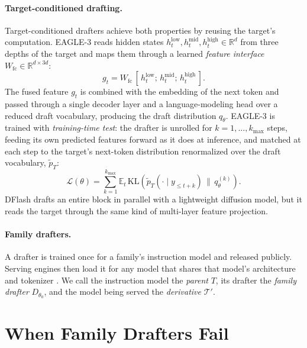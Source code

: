 \documentclass[11pt]{article}
\newcommand{\Tp}{\mathcal{T}'}
\begin{document}
\paragraph{Target-conditioned drafting.}
Target-conditioned drafters achieve both properties by reusing the target's computation.
EAGLE-3 \citep{li2025eagle3} reads hidden states $h^{\text{low}}_t, h^{\text{mid}}_t, h^{\text{high}}_t \in \mathbb{R}^{d}$ from three depths of the target and maps them through a learned \emph{feature interface} $W_{\text{fc}} \in \mathbb{R}^{d \times 3d}$:
\begin{equation}
  g_t = W_{\text{fc}}\,[\,h^{\text{low}}_t ;\, h^{\text{mid}}_t ;\, h^{\text{high}}_t\,].
  \label{eq:interface}
\end{equation}
The fused feature $g_t$ is combined with the embedding of the next token and passed through a single decoder layer and a language-modeling head over a reduced draft vocabulary, producing the draft distribution $q_\theta$.
EAGLE-3 is trained with \emph{training-time test}: the drafter is unrolled for $k=1,\dots,k_{\max}$ steps, feeding its own predicted features forward as it does at inference, and matched at each step to the target's next-token distribution renormalized over the draft vocabulary, $\tilde p_T$:
\begin{equation}
  \mathcal{L}(\theta) = \sum_{k=1}^{k_{\max}} \mathbb{E}_{t}\, \mathrm{KL}\!\left(\tilde p_{T}(\cdot \mid y_{\le t+k}) \,\big\|\, q^{(k)}_\theta\right).
  \label{eq:ttt}
\end{equation}
DFlash \citep{chen2026dflash} drafts an entire block in parallel with a lightweight diffusion model, but it reads the target through the same kind of multi-layer feature projection.

\paragraph{Family drafters.}
A drafter is trained once for a family's instruction model and released publicly.
Serving engines then load it for any model that shares that model's architecture and tokenizer \citep{kwon2023vllm,redhat2025speculators}.
We call the instruction model the \emph{parent} $T$, its drafter the \emph{family drafter} $D_{\theta_0}$, and the model being served the \emph{derivative} $\Tp$.

\section{When Family Drafters Fail}
\label{sec:census}
\end{document}
